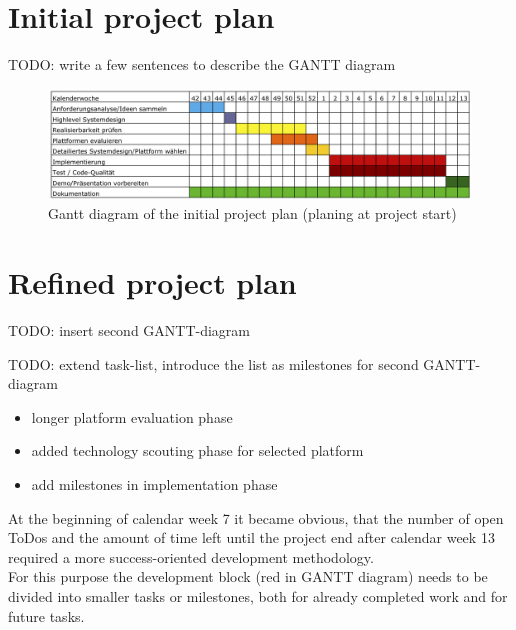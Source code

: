\section{Initial project plan}

TODO: write a few sentences to describe the GANTT diagram 

\begin{figure}[h!]
\centering
\includegraphics[width=16cm]{pics/gantt2.png}
\caption{Gantt diagram of the initial project plan (planing at project start)}
\label{gantt1}
\end{figure}

\section{Refined project plan}

TODO: insert second GANTT-diagram

TODO: extend task-list, introduce the list as milestones for second GANTT-diagram



\begin{itemize}
\item longer platform evaluation phase
\item added technology scouting phase for selected platform
\item add milestones in implementation phase
\end{itemize}
At the beginning of calendar week 7 it became obvious, that the number of open ToDos and the amount of time left until the project end after calendar week 13 required a more success-oriented development methodology.\\
For this purpose the development block (red in GANTT diagram) needs to be divided into smaller tasks or milestones, both for already completed work and for future tasks.\\

